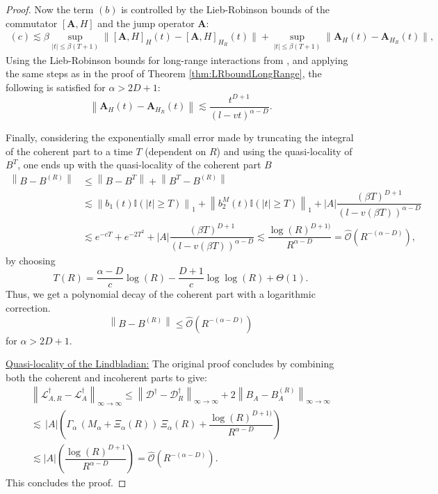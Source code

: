 \documentclass[11pt]{article}
\numberwithin{equation}{section}
\numberwithin{figure}{section}
\numberwithin{table}{section}
\theoremstyle{definition}
\theoremstyle{plain}
\theoremstyle{remark}
\newcommand{\Id}{\mathbb{I}}
\newcommand{\Li}{\mathcal{L}}
\newcommand{\vA}{\bm{A}}
\newcommand{\norm}[1]{\left\lVert#1\right\rVert}
\newcommand{\normm}[2]{\left\lVert#1\right\rVert_{#2}}
\newcommand{\abs}[1]{\left \vert#1\right\vert}
\begin{document}
\begin{proof}
Now the term $(b)$ is controlled by the Lieb-Robinson bounds of the commutator $[\vA,H]$ and the jump operator $\vA$:
\begin{multline}
    ( c )
\lesssim 
\beta \sup_{|t| \le \beta (T + 1)} 
\| [\vA, H]_H(t) - [\vA, H]_{H_R}(t) \|
+ 
\sup_{|t| \le \beta (T + 1)} 
\| \vA_H(t) - \vA_{H_R}(t) \|,
\end{multline}
Using the Lieb-Robinson bounds for long-range interactions from \cite{kuwahara_strictly_2020}, and applying the same steps as in the proof of Theorem \ref{thm:LRboundLongRange}, the following is satisfied for $\alpha>2D+1$:\[\norm{\vA_H(t)-\vA_{H_R}(t)}\lesssim \dfrac{t^{D+1}}{(l-v t)^{\alpha-D}}.\]

Finally, considering the exponentially small error made by truncating the integral of the coherent part to a time $T$ (dependent on $R$) and using the quasi-locality of $B^T$, one ends up with the quasi-locality of the coherent part $B$
\begin{align}
    \norm{B-B^{(R)}}&\leq \norm{B-B^T}+\norm{B^T-B^{(R)}}\\
    &\nonumber\lesssim \normm{b_1(t)\Id(\abs{t}\geq T)}{1}+\normm{b_2^M(t)\Id (\abs{t}\geq T)}{1}+\abs{A}\dfrac{(\beta T)^{D+1}}{(l-v (\beta T))^{\alpha-D}}\\
    &\nonumber\lesssim e^{-cT}+e^{-2T^2}+\abs{A}\dfrac{(\beta T)^{D+1}}{(l-v (\beta T))^{\alpha-D}}\lesssim \dfrac{\log(R)^{D+1)}}{R^{\alpha -D}}=\hat{\mathcal{O}}(R^{-(\alpha-D)}),
\end{align}
by choosing\[T(R)=\dfrac{\alpha-D}{c}\log(R)-\dfrac{D+1}{c}\log \log (R)+\Theta(1).\]Thus, we get a polynomial decay of the coherent part with a logarithmic correction. 
    \begin{equation}
        \norm{B-B^{(R)}}\leq \hat{\mathcal{O}}(R^{-(\alpha-D)})
    \end{equation}
    for $\alpha >2D+1$.

  \underline{Quasi-locality of the Lindbladian:}    The original proof concludes by combining both the coherent and incoherent parts to give:
\begin{multline}
    \normm{\Li_{A,R}^\dagger-\Li_{A}^\dagger}{\infty \to \infty} \leq \normm{\mathcal{D}^\dagger - \mathcal{D}_R^\dagger}{\infty \to \infty }+2 \normm{B_A-B_A^{(R)}}{\infty\to\infty}
    \\
    \lesssim\,\abs{A}\left (\Gamma_\alpha\,(M_\alpha+\Xi_\alpha(R))\,\Xi_\alpha(R) + \dfrac{\log(R)^{D+1)}}{R^{\alpha -D}}\right )
    \\
    \lesssim \abs{A}\left ( \dfrac{\log(R)^{D+1}}{R^{\alpha -D}}\right )=\hat{\mathcal{O}}(R^{-(\alpha-D)}).
\end{multline}
This concludes the proof.
\end{proof}
\end{document}
